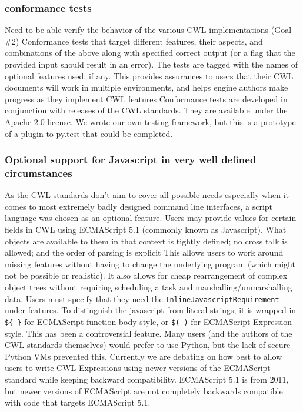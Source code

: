 \subsubsection{conformance tests}
Need to be able verify the behavior of the various CWL implementations (Goal \#2)
Conformance tests that target different features, their aspects, and combinations of the above along with specified correct output (or a flag that the provided input should result in an error). The tests are tagged with the names of optional features used, if any.
This provides assurances to users that their CWL documents will work in multiple environments, and helps engine authors make progress as they implement CWL features
Conformance tests are developed in conjunction with releases of the CWL standards. They are available under the Apache 2.0 license.
We wrote our own testing framework, but this is a prototype of a plugin to py.test that could be completed.
\subsubsection{Optional support for Javascript in very well defined circumstances}
As the CWL standards don’t aim to cover all possible needs especially when it comes to most extremely badly designed command line interfaces, a script language was chosen as an optional feature.
Users may provide values for certain fields in CWL using ECMAScript 5.1 (commonly known as Javascript). What objects are available to them in that context is tightly defined; no cross talk is allowed; and the order of parsing is explicit
This allows users to work around missing features without having to change the underlying program (which might not be possible or realistic). It also allows for cheap rearrangement of complex object trees without requiring scheduling a task and marshalling/unmarshalling data.
Users must specify that they need the \verb|InlineJavascriptRequirement| under features. To distinguish the javascript from literal strings, it is wrapped in \verb|${ }| for  ECMAScript function body style, or \verb|$( )| for ECMAScript Expression style.
This has been a controversial feature. Many users (and the authors of the CWL standards themselves) would prefer to use Python, but the lack of secure Python VMs prevented this. Currently we are debating on how best to allow users to write CWL Expressions using newer versions of the ECMAScript standard while keeping backward compatibility. ECMAScript 5.1 is from 2011, but newer versions of ECMAScript are not completely backwards compatible with code that targets ECMAScript 5.1.
